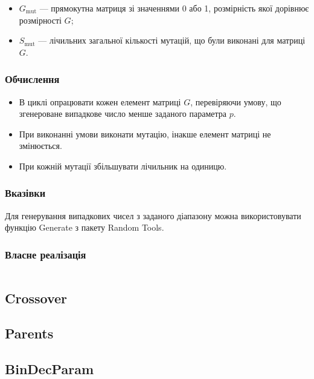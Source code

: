 \documentclass[a4paper, 12pt]{article}
\numberwithin{equation}{section}
\begin{document}
\begin{itemize}
    \item $G_{\text{mut}}$ --- прямокутна матриця зі значеннями 0 або 1, розмірність якої дорівнює розмірності $G$;
    \item $S_{\text{mut}}$ --- лічильних загальної кількості мутацій, що були виконані для матриці $G$.
\end{itemize}

\subsubsection{Обчислення}

\begin{itemize}
    \item В циклі опрацювати кожен елемент матриці $G$, перевіряючи умову, що згенероване випадкове число менше заданого параметра $p$. 
    \item При виконанні умови виконати мутацію, інакше елемент матриці не змінюється. 
    \item При кожній мутації збільшувати лічильник на одиницю.
\end{itemize}

\subsubsection{Вказівки}

Для генерування випадкових чисел з заданого діапазону можна використовувати функцію Generate з пакету Random Tools.

\subsubsection{Власне реалізація}

\inputminted[firstline=6, lastline=15]{python}{../code/mutation.py}

\subsection{Crossover}

\subsection{Parents}

\subsection{BinDecParam}
\end{document}
